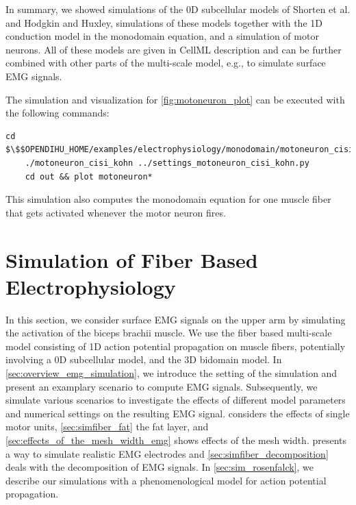 In summary, we showed simulations of the 0D subcellular models of Shorten et al. and Hodgkin and Huxley, simulations of these models together with the 1D conduction model in the monodomain equation, and a simulation of motor neurons. All of these models are given in CellML description and can be further combined with other parts of the multi-scale model, e.g., to simulate surface EMG signals.

\begin{reproduce_no_break}
  The simulation and visualization for \cref{fig:motoneuron_plot} can be executed with the following commands:
  \begin{lstlisting}[columns=fullflexible,breaklines=true,postbreak=\mbox{\textcolor{gray}{$\hookrightarrow$}\space}]
    cd $\$$OPENDIHU_HOME/examples/electrophysiology/monodomain/motoneuron_cisi_kohn/build_release
    ./motoneuron_cisi_kohn ../settings_motoneuron_cisi_kohn.py
    cd out && plot motoneuron*
  \end{lstlisting}
  This simulation also computes the monodomain equation for one muscle fiber that gets activated whenever the motor neuron fires.
\end{reproduce_no_break}

%

%

\section{Simulation of Fiber Based Electrophysiology}\label{sec:results_fiber_based_electrophysiology}
%

In this section, we consider surface EMG signals on the upper arm by simulating the activation of the biceps brachii muscle. We use the fiber based multi-scale model consisting of 1D action potential propagation on muscle fibers, potentially involving a 0D subcellular model, and the 3D bidomain model.
In \cref{sec:overview_emg_simulation}, we introduce the setting of the simulation and present an examplary scenario to compute EMG signals.
Subsequently, we simulate various scenarios to investigate the effects of different model parameters and numerical settings on the resulting EMG signal.  considers the effects of single motor units, \cref{sec:simfiber_fat} the fat layer, and \cref{sec:effects_of_the_mesh_width_emg} shows effects of the mesh width.  presents a way to simulate realistic EMG electrodes and \cref{sec:simfiber_decomposition} deals with the decomposition of EMG signals.
In \cref{sec:sim_rosenfalck}, we describe our simulations with a phenomenological model for action potential propagation.

